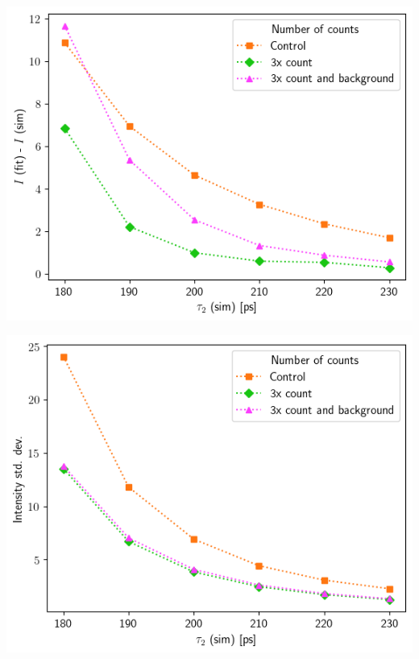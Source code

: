 {\begin{minipage}{ .47\linewidth}
    \includegraphics[width=\linewidth]{Batch 5/5050-diff i1.png}
    \label{fig:compcount-I-5050}
\end{minipage}
\hfill
\begin{minipage}{ .47\linewidth}
    \includegraphics[width=\linewidth]{Batch 5/5050-err i1.png}
    \label{fig:compcount-Ierr-5050}
\end{minipage}
\begin{minipage}{ .47\linewidth}

\end{minipage}}

